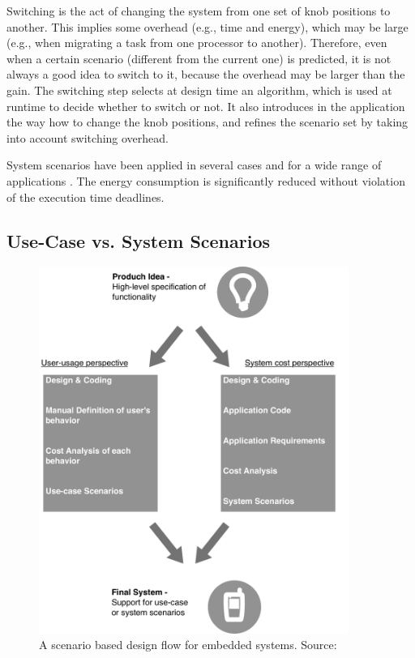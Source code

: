 \begin{enumerate}
Switching is the act of changing the system from one set of knob positions to another. This implies some overhead (e.g., time and energy), which may be large (e.g., when migrating a task from one processor to another). 
Therefore, even when a certain scenario (different from the current one) is predicted, it is not always a good idea to switch to it, because the overhead may be larger than the gain. The switching step selects at design time an algorithm, which is used at runtime to decide whether to switch or not. 
It also introduces in the application the way how to change the knob positions, and refines the scenario set by taking into account switching overhead.

\end{enumerate}

System scenarios have been applied in several cases and for a wide range of applications \cite{tcm}.
The energy consumption is significantly reduced without violation of the execution time deadlines.

\subsection{Use-Case vs. System Scenarios}

\begin{figure}[!t]
	\centering
	\includegraphics[width=0.9\textwidth]{Images/versus.pdf}	
	\caption{A scenario based design flow for embedded systems. Source: \cite{GheoThesis} }
	\label{fig:versus}
\end{figure}

